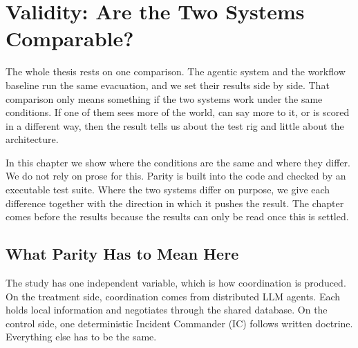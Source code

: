 \chapter{Validity: Are the Two Systems Comparable?}
\label{ch:validity}

%

The whole thesis rests on one comparison. The agentic system and the workflow
baseline run the same evacuation, and we set their results side by side. That
comparison only means something if the two systems work under the same
conditions. If one of them sees more of the world, can say more to it, or is
scored in a different way, then the result tells us about the test rig and
little about the architecture.

In this chapter we show where the conditions are the same and where they
differ. We do not rely on prose for this. Parity is built into the code and
checked by an executable test suite. Where the two systems differ on purpose,
we give each difference together with the direction in which it pushes the
result. The chapter comes before the results because the results can only be
read once this is settled.

\section{What Parity Has to Mean Here}
\label{sec:val:definition}

The study has one independent variable, which is how coordination is
produced. On the treatment side, coordination comes from distributed LLM
agents. Each holds local information and negotiates through the shared
database. On the control side, one deterministic Incident Commander (IC)
follows written doctrine. Everything else has to be the same.

